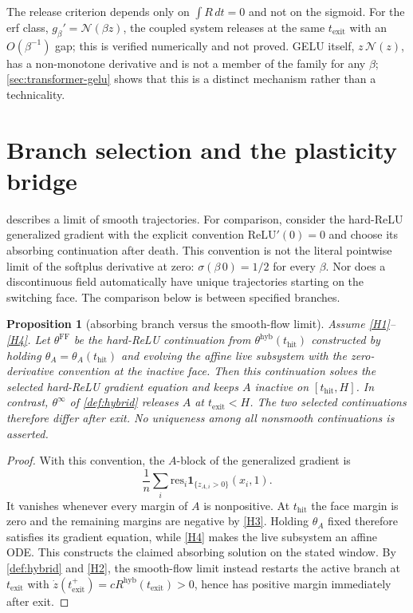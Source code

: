 \documentclass[11pt]{article}
\newtheorem{proposition}[proposition]{Proposition}
\theoremstyle{definition}
\theoremstyle{remark}
\newcommand{\thit}{t_{\mathrm{hit}}}
\newcommand{\texit}{t_{\mathrm{exit}}}
\newcommand{\hyb}{\mathrm{hyb}}
\begin{document}
The release criterion depends only on $\int R\,dt=0$ and not on the sigmoid. For
the erf class, $g_\beta'=\mathcal N(\beta z)$, the coupled system releases at the
same $\texit$ with an $O(\beta^{-1})$ gap; this is verified numerically and not
proved. GELU itself, $z\,\mathcal N(z)$, has a non-monotone derivative and is not
a member of the family for any $\beta$; \cref{sec:transformer-gelu} shows that
this is a distinct mechanism rather than a technicality.

\section{Branch selection and the plasticity bridge}\label{sec:noncomm}

 describes a limit of smooth trajectories. For comparison,
consider the hard-ReLU generalized gradient with the explicit convention
$\mathrm{ReLU}'(0)=0$ and choose its absorbing continuation after death.
This convention is not the literal pointwise limit of the softplus derivative
at zero: $\sigma(\beta\,0)=1/2$ for every $\beta$. Nor does a discontinuous
field automatically have unique trajectories starting on the switching face.
The comparison below is between specified branches.

\begin{proposition}[absorbing branch versus the smooth-flow limit]\label{prop:noncomm}
Assume \eqref{H1}--\eqref{H4}. Let $\theta^{\mathrm{FF}}$ be the hard-ReLU
continuation from $\theta^{\hyb}(\thit)$ constructed by holding
$\theta_A=\theta_A(\thit)$ and evolving the affine live subsystem with the
zero-derivative convention at the inactive face. Then this continuation solves
the selected hard-ReLU gradient equation and keeps $A$ inactive on $[\thit,H]$.
In contrast, $\theta^\infty$ of \cref{def:hybrid} releases $A$ at
$\texit<H$. The two selected continuations therefore differ after exit.
No uniqueness among all nonsmooth continuations is asserted.
\end{proposition}

\begin{proof}
With this convention, the $A$-block of the generalized gradient is
\[
\frac1n\sum_i\mathrm{res}_i\mathbf 1_{\{z_{A,i}>0\}}(x_i,1).
\]
It vanishes whenever every margin of $A$ is nonpositive. At $\thit$ the
face margin is zero and the remaining margins are negative by \eqref{H3}.
Holding $\theta_A$ fixed therefore satisfies its gradient equation, while
\eqref{H4} makes the live subsystem an affine ODE. This constructs the claimed
absorbing solution on the stated window. By \cref{def:hybrid} and \eqref{H2},
the smooth-flow limit instead restarts the active branch at $\texit$ with
$\dot z(\texit^+)=cR^{\hyb}(\texit)>0$, hence has positive margin immediately
after exit.
\end{proof}
\end{document}
